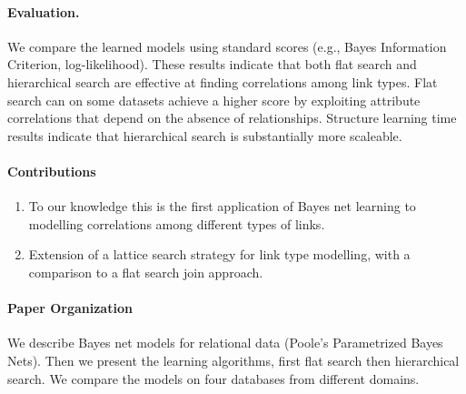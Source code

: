 \documentclass{article}
\begin{document}

\paragraph{Evaluation.} We compare the learned models using standard scores (e.g., Bayes Information Criterion, log-likelihood). 
These results indicate that both flat search and hierarchical search are effective at finding correlations among link types. 
Flat search can on some datasets achieve a higher score by exploiting attribute correlations that depend on the absence of relationships. 
Structure learning time results indicate that hierarchical search is substantially more scaleable.

\paragraph{Contributions} 

\begin{enumerate}
\item To our knowledge this is the first application of Bayes net learning to modelling correlations among different types of links.
\item Extension of a lattice search strategy for link type modelling, with a comparison to a flat search join approach.
\end{enumerate}

\paragraph{Paper Organization} We describe Bayes net models for relational data (Poole's Parametrized Bayes Nets). Then we present the learning algorithms, first flat search then hierarchical search. We compare the models on four databases from different domains.
\end{document}
